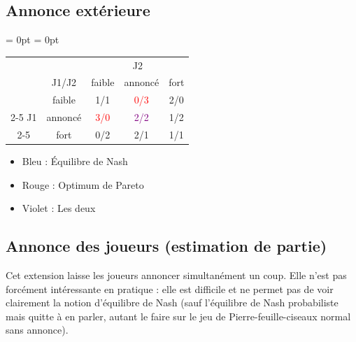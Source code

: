 \documentclass{article}
\begin{document}
\subsection{Annonce extérieure}
\label{variante:annonce}
\begin{table}[H]
\renewcommand{\arraystretch}{2}%
\centering
\aboverulesep = 0pt
\belowrulesep = 0pt
\begin{tabular}{cc|c|c|c}
          & & \multicolumn{3}{c}{J2} \\ 
    & J1/J2 & faible & annoncé & fort \\ \midrule
    & faible & 1/1 & \textcolor{red}{0/3} & 2/0  \\ \cmidrule{2-5}
    J1 &annoncé & \textcolor{red}{3/0} & \textcolor{purple}{2/2} & 1/2 \\ \cmidrule{2-5}
     & fort & 0/2 & 2/1 & 1/1 
\end{tabular}
\end{table}

\begin{itemize}
    \item Bleu : Équilibre de Nash
    \item Rouge : Optimum de Pareto
    \item Violet : Les deux
\end{itemize}
\newpage
\subsection{Annonce des joueurs (estimation de partie)}
\label{variante:double_annonce}

Cet extension laisse les joueurs annoncer simultanément un coup. Elle n'est pas forcément intéressante en pratique : elle est difficile et ne permet pas de voir clairement la notion d'équilibre de Nash (sauf l'équilibre de Nash probabiliste mais quitte à en parler, autant le faire sur le jeu de Pierre-feuille-ciseaux normal sans annonce).
\end{document}
